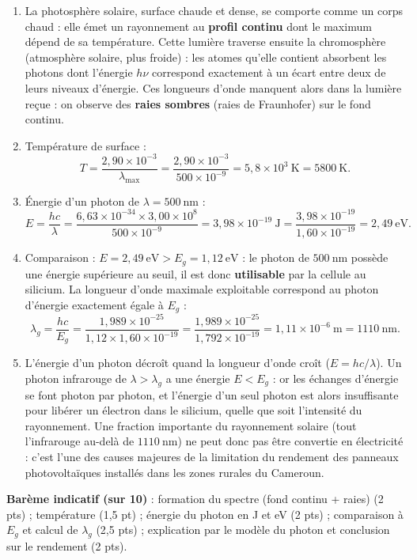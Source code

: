 \documentclass[11pt]{article}
\begin{document}
\begin{corrige}
\begin{enumerate}
\item La photosphère solaire, surface chaude et dense, se comporte comme un corps chaud : elle émet un rayonnement au \textbf{profil continu} dont le maximum dépend de sa température. Cette lumière traverse ensuite la chromosphère (atmosphère solaire, plus froide) : les atomes qu'elle contient absorbent les photons dont l'énergie $h\nu$ correspond exactement à un écart entre deux de leurs niveaux d'énergie. Ces longueurs d'onde manquent alors dans la lumière reçue : on observe des \textbf{raies sombres} (raies de Fraunhofer) sur le fond continu.
\item Température de surface :
\[ T = \frac{2,90\times10^{-3}}{\lambda_{\max}} = \frac{2,90\times10^{-3}}{500\times10^{-9}} = 5,8\times10^{3}\ \mathrm{K} = 5800\ \mathrm{K}. \]
\item Énergie d'un photon de $\lambda = 500\ \mathrm{nm}$ :
\[ E = \frac{hc}{\lambda} = \frac{6,63\times10^{-34}\times3,00\times10^8}{500\times10^{-9}} = 3,98\times10^{-19}\ \mathrm{J} = \frac{3,98\times10^{-19}}{1,60\times10^{-19}} = 2,49\ \mathrm{eV}. \]
\item Comparaison : $E = 2,49\ \mathrm{eV} > E_g = 1,12\ \mathrm{eV}$ : le photon de $500\ \mathrm{nm}$ possède une énergie supérieure au seuil, il est donc \textbf{utilisable} par la cellule au silicium. La longueur d'onde maximale exploitable correspond au photon d'énergie exactement égale à $E_g$ :
\[ \lambda_g = \frac{hc}{E_g} = \frac{1,989\times10^{-25}}{1,12\times1,60\times10^{-19}} = \frac{1,989\times10^{-25}}{1,792\times10^{-19}} = 1,11\times10^{-6}\ \mathrm{m} = 1110\ \mathrm{nm}. \]
\item L'énergie d'un photon décroît quand la longueur d'onde croît ($E = hc/\lambda$). Un photon infrarouge de $\lambda > \lambda_g$ a une énergie $E < E_g$ : or les échanges d'énergie se font photon par photon, et l'énergie d'un seul photon est alors insuffisante pour libérer un électron dans le silicium, quelle que soit l'intensité du rayonnement. Une fraction importante du rayonnement solaire (tout l'infrarouge au-delà de $1110\ \mathrm{nm}$) ne peut donc pas être convertie en électricité : c'est l'une des causes majeures de la limitation du rendement des panneaux photovoltaïques installés dans les zones rurales du Cameroun.
\end{enumerate}
\textbf{Barème indicatif (sur 10)} : formation du spectre (fond continu + raies) (2 pts) ; température (1,5 pt) ; énergie du photon en J et eV (2 pts) ; comparaison à $E_g$ et calcul de $\lambda_g$ (2,5 pts) ; explication par le modèle du photon et conclusion sur le rendement (2 pts).


\end{corrige}
\end{document}
